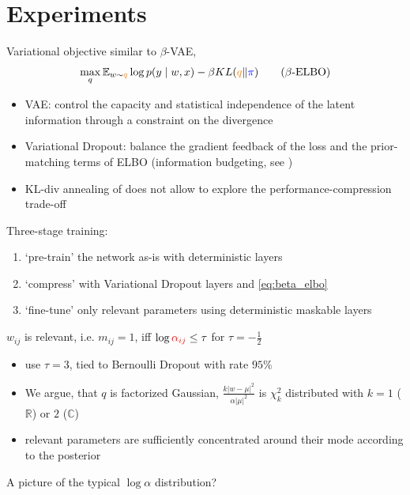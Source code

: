 \documentclass{beamer}
\newcommand{\real}{\mathbb{R}}
\newcommand{\cplx}{\mathbb{C}}
\begin{document}


\section{Experiments} %
\label{sec:experiments}

\begin{frame}[c]{\insertsection}
  Variational objective similar to $\beta$-VAE, \citep{higgins_beta-vae_2017}
  \begin{equation}
  \label{eq:beta_elbo}
    \max_q
    \mathbb{E}_{w \sim {\color{orange} q}}
      \log p(y\mid w, x)  %
    - \beta KL({\color{orange} q}\|{\color{blue} \pi})
    \tag{$\beta$-ELBO}
  \end{equation}
  \begin{itemize}
    \item VAE: control the capacity and statistical independence of the latent
    information through a constraint on the divergence
    \item Variational Dropout: balance the gradient feedback of the loss and the
    prior-matching terms of ELBO (information budgeting, see \citep{BitsBack})
    \item KL-div annealing of \citet{molchanov_variational_2017} does not allow
    to explore the performance-compression trade-off
  \end{itemize}
\end{frame}

\begin{frame}[c]{\insertsection}
  Three-stage training:
  \begin{enumerate}
    \item `pre-train' the network as-is with deterministic layers
    \item `compress' with Variational Dropout layers and \eqref{eq:beta_elbo}
    \item `fine-tune' only relevant parameters using deterministic maskable layers
  \end{enumerate}

  \medskip
  $w_{ij}$ is relevant, i.e. $m_{ij} = 1$, iff $
    \log{{\color{red} \alpha_{ij}}} \leq \tau
  $ for $\tau = -\tfrac12$
  \begin{itemize}
    \item \citet{molchanov_variational_2017,kingma_variational_2015} use $\tau=3$,
      tied to Bernoulli Dropout with rate $95\%$
    \item We argue, that $q$ is factorized Gaussian, $
        \tfrac{k \lvert w - \mu \rvert^2}
              {\alpha \lvert \mu \rvert^2}
      $ is $\chi^2_k$ distributed with $k=1$ ($\real$) or $2$ ($\cplx$)
    \item relevant parameters are sufficiently concentrated around their mode according
    to the posterior
  \end{itemize}

  A picture of the typical $\log \alpha$ distribution?
\end{frame}
\end{document}
